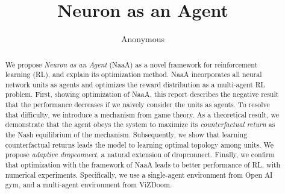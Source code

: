\documentclass{article} %
\title{Neuron as an Agent}
\author{Anonymous}
\begin{document}
\maketitle

\begin{abstract}
We propose {\em Neuron as an Agent} (NaaA) as a novel framework for reinforcement learning (RL), and explain its optimization method.
NaaA incorporates all neural network units as agents and optimizes the reward distribution as a multi-agent RL problem.
First, showing optimization of NaaA, this report describes the negative result that the performance decreases if we naively consider the units as agents.
To resolve that difficulty, we introduce a mechanism from game theory.
As a theoretical result, we demonstrate that the agent obeys the system to maximize its {\em counterfactual return} as the Nash equilibrium of the mechanism.
Subsequently, we show that learning counterfactual returns leads the model to learning optimal topology among units.
We propose {\em adaptive dropconnect}, a natural extension of dropconnect.
Finally, we confirm that optimization with the framework of NaaA leads to better performance of RL, with numerical experiments.
Specifically, we use a single-agent environment from Open AI gym, and a multi-agent environment from ViZDoom.
\end{abstract}














\end{document}
